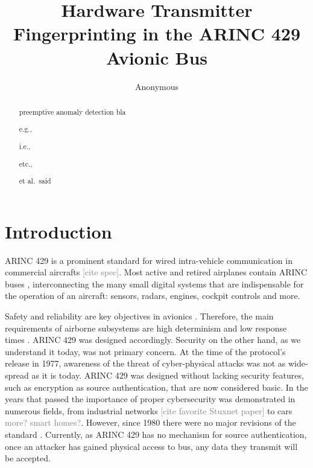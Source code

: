 \documentclass[conference]{IEEEtran}
\title{Hardware Transmitter Fingerprinting in the ARINC 429 Avionic Bus}
\author{Anonymous}
\begin{document}
\maketitle

\begin{abstract}
  preemptive anomaly detection
    bla
    
    e.g., 
    
    i.e.,
    
    etc.,
    
    et al.\ said
    
\end{abstract}


\section{Introduction}
  
  ARINC 429 is a prominent standard for wired intra-vehicle communication in commercial aircrafts \textcolor{gray}{[cite spec]}. Most active and retired airplanes contain ARINC buses \cite{fuchs2012evolution}, interconnecting the many small digital systems that are indispensable for the operation of an aircraft: sensors, radars, engines, cockpit controls and more.
  
  Safety and reliability are key objectives in avionics \cite{fuchs2012evolution}. Therefore, the main requirements of airborne subsystems are high determinism and low response times \cite{thanthry2005aviation}. ARINC 429 was designed accordingly. Security on the other hand, as we understand it today, was not primary concern. At the time of the protocol's release in 1977, awareness of the threat of cyber-physical attacks was not as wide-spread as it is today. ARINC 429 was designed without lacking security features, such as encryption as source authentication, that are now considered basic. In the years that passed the importance of proper cybersecurity was demonstrated in numerous fields, from industrial networks \textcolor{gray}{[cite favorite Stuxnet paper]} to cars \cite{miller2015remote} \textcolor{gray}{more? smart homes?}. However, since 1980 there were no major revisions of the standard \cite{18937420070101}. Currently, as ARINC 429 has no mechanism for source authentication, once an attacker has gained physical access to bus, any data they transmit will be accepted.
  
\end{document}
